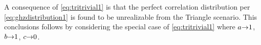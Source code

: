 A consequence of \cref{eq:tritrivial1} is that the perfect correlation distribution per \cref{eq:ghzdistribution1} 
is found to be unrealizable from the Triangle scenario. This conclusions follows by considering the special case of \cref{eq:tritrivial1} where $a\mathord{\to}1$, $b\mathord{\to}1$, $c\mathord{\to}0$.


